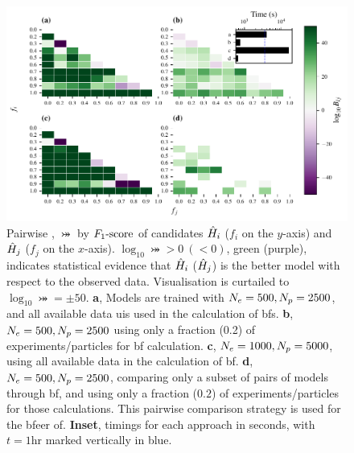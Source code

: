 \begin{figure}
    \includegraphics{theoretical_study/figures/bayes_factors_by_f_scores.pdf}
    \caption[ by $\fs$.]{
        Pairwise , $\bij$ by $\fs$ of candidates $\hat{H}_i$ ($f_i$ on the $y$-axis) 
        and $\hat{H}_j$ ($f_j$ on the $x$-axis).
        $\log_{10}\bij > 0 \ (<0)$, green (purple), indicates statistical evidence that $\hat{H}_i$ ($\hat{H}_j$) 
        is the better model with respect to the observed data.
        Visualisation is curtailed to $\log_{10} \bij = \pm 50$. 
        \textbf{a}, Models are trained with $N_e=500, N_p=2500$,
            and all available data uis used in the calculation of \glspl{bf}. 
        \textbf{b}, $N_e=500, N_p=2500$ using only a fraction (0.2) of experiments/particles for \gls{bf} calculation. 
        \textbf{c}, $N_e=1000, N_p=5000$, using all available data in the calculation of \gls{bf}. 
        \textbf{d}, $N_e=500, N_p=2500$, comparing only a subset of pairs of models through \gls{bf}, 
            and using only a fraction ($0.2$) of experiments/particles for those calculations. 
            This pairwise comparison strategy is used for the \gls{bfeer} \gls{of}. 
        \textbf{Inset}, timings for each approach in seconds, with $t=1\textrm{hr}$ marked vertically in blue. 
    }
    \label{fig:bf_by_fscore}
\end{figure}


